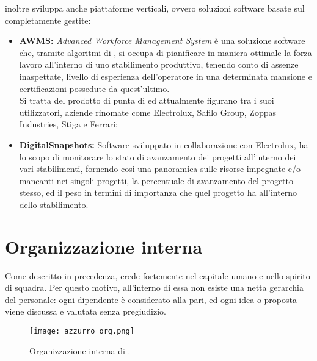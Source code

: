 \AD{} inoltre sviluppa anche piattaforme  verticali, ovvero soluzioni software basate sul  completamente gestite:
\begin{itemize}
\item \textbf{AWMS:} \textit{Advanced Workforce Management System} è una soluzione software che, tramite algoritmi di , si occupa di pianificare in maniera ottimale la forza lavoro all'interno di uno stabilimento produttivo, tenendo conto di assenze inaspettate, livello di esperienza dell'operatore in una determinata mansione e certificazioni possedute da quest'ultimo. \\
Si tratta del prodotto di punta di \AD{} ed attualmente figurano tra i suoi utilizzatori, aziende rinomate come Electrolux, Safilo Group, Zoppas Industries, Stiga e Ferrari;
\item \textbf{DigitalSnapshots:} Software sviluppato in collaborazione con Electrolux, ha lo scopo di monitorare lo stato di avanzamento dei progetti all'interno dei vari stabilimenti, fornendo così una panoramica sulle risorse impegnate e/o mancanti nei singoli progetti, la percentuale di avanzamento del progetto stesso, ed il peso in termini di importanza che quel progetto ha all'interno dello stabilimento.
\end{itemize}

\section{Organizzazione interna}
Come descritto in precedenza, \AD{} crede fortemente nel capitale umano e nello spirito di squadra. Per questo motivo, all'interno di essa non esiste una netta gerarchia del personale: ogni dipendente è considerato alla pari, ed ogni idea o proposta viene discussa e valutata senza pregiudizio. \\

\begin{figure}[h]
\texttt{[image: azzurro\_org.png]}
\centering
\caption{Organizzazione interna di \AD .}
\label{fig:azzurro-org}
\end{figure}

